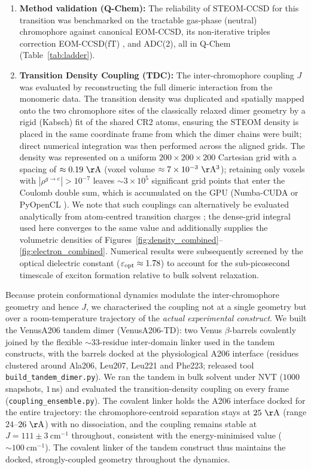 \documentclass[journal=jpcbfk, manuscript=article, layout=twocolumn, doi=true]{achemso}
\begin{document}
\begin{enumerate}
    \item \textbf{Method validation (Q-Chem):} The reliability of STEOM-CCSD for this transition was benchmarked on the tractable gas-phase (neutral) chromophore against canonical EOM-CCSD, its non-iterative triples correction EOM-CCSD(fT) \cite{manohar2008ft}, and ADC(2), all in Q-Chem \cite{epifanovsky2021qchem} (Table~\ref{tab:ladder}).

    \item \textbf{Transition Density Coupling (TDC):} The inter-chromophore coupling $J$ was evaluated by reconstructing the full dimeric interaction from the monomeric data. The transition density was duplicated and spatially mapped onto the two chromophore sites of the classically relaxed dimer geometry by a rigid (Kabsch) fit of the shared CR2 atoms, ensuring the STEOM density is placed in the same coordinate frame from which the dimer chains were built; direct numerical integration was then performed across the aligned grids. The density was represented on a uniform $200\times200\times200$ Cartesian grid with a spacing of $\approx 0.19~\mathrm{\AA}$ (voxel volume $\approx 7\times10^{-3}~\mathrm{\AA^3}$); retaining only voxels with $|\rho^{g\to e}| > 10^{-7}$ leaves $\sim 3\times10^{5}$ significant grid points that enter the Coulomb double sum, which is accumulated on the GPU (Numba-CUDA or PyOpenCL \cite{lam2015numba,klockner2012pycuda}). We note that such couplings can alternatively be evaluated analytically from atom-centred transition charges \cite{hsu2009}; the dense-grid integral used here converges to the same value and additionally supplies the volumetric densities of Figures~\ref{fig:density_combined}--\ref{fig:electron_combined}. Numerical results were subsequently screened by the optical dielectric constant ($\varepsilon_{\rm opt} \approx 1.78$) to account for the sub-picosecond timescale of exciton formation relative to bulk solvent relaxation.
\end{enumerate}

{Because protein conformational dynamics modulate the inter-chromophore geometry and hence $J$, we characterised the coupling not at a single geometry but over a room-temperature trajectory of the \emph{actual experimental construct}. We built the VenusA206 tandem dimer (VenusA206-TD): two Venus $\beta$-barrels covalently joined by the flexible ${\sim}33$-residue inter-domain linker used in the tandem constructs, with the barrels docked at the physiological A206 interface (residues clustered around Ala206, Leu207, Leu221 and Phe223; released tool \texttt{build\_\allowbreak tandem\_\allowbreak dimer.py}). We ran the tandem in bulk solvent under NVT ($1000$ snapshots, $1$\,ns) and evaluated the transition-density coupling on every frame (\texttt{coupling\_ensemble.py}). The covalent linker holds the A206 interface docked for the entire trajectory: the chromophore-centroid separation stays at $25~\mathrm{\AA}$ (range $24$--$26~\mathrm{\AA}$) with no dissociation, and the coupling remains stable at $J = 111 \pm 3~\mathrm{cm^{-1}}$ throughout, consistent with the energy-minimised value (${\sim}100~\mathrm{cm^{-1}}$). The covalent linker of the tandem construct thus maintains the docked, strongly-coupled geometry throughout the dynamics.}
\end{document}
